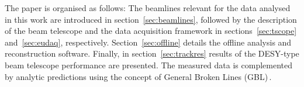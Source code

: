 The paper is organised as follows: 
The beamlines relevant for the data analysed in this work are introduced in section~\ref{sec:beamlines}, followed by the description of the beam telescope
 and the data acquisition framework in sections~\ref{sec:tscope} and~\ref{sec:eudaq}, respectively.
Section~\ref{sec:offline} details the offline analysis and reconstruction software. 
Finally, in section~\ref{sec:trackres} results of the DESY-type beam telescope performance are presented. %
The measured data is complemented by analytic predictions using the concept of General Broken Lines (GBL)\,\cite{Kleinwort-2012}.
